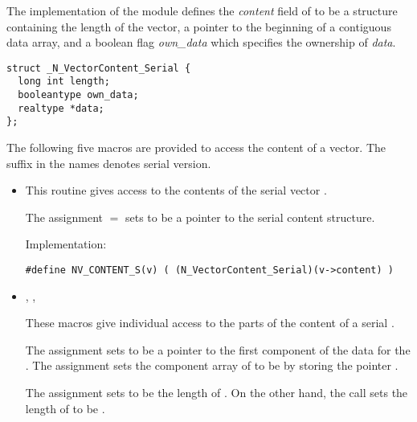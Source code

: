 
The implementation of the {\nvector} module defines the {\em content} 
field of  to be a structure containing the length of the vector,
a pointer to the beginning of a contiguous data array, and a boolean flag
{\em own\_data} which specifies the ownership of {\em data}.
\begin{verbatim} 
struct _N_VectorContent_Serial {
  long int length;
  booleantype own_data;
  realtype *data;
};
\end{verbatim}
The following five macros are provided to access the content of a {\nvecs}
vector. The suffix  in the names denotes serial version.
\begin{itemize}

\item {}                             
    
  This routine gives access to the contents of the serial
  vector .
  
  The assignment  $=$  sets           
   to be a pointer to the serial  content  
  structure.                                             
                                                            
  Implementation: 
  
  \verb|#define NV_CONTENT_S(v) ( (N_VectorContent_Serial)(v->content) )|
  
\item {}, ,                                  
                                                            
  These macros give individual access to the parts of    
  the content of a serial .                        
                                                               
  The assignment  sets  to be     
  a pointer to the first component of the data for the  . 
  The assignment  sets the component array of  to     
  be  by storing the pointer .                   
  
  The assignment  sets  to be     
  the length of . On the other hand, the call  
  sets the length of  to be .
                                                            

\end{itemize}
